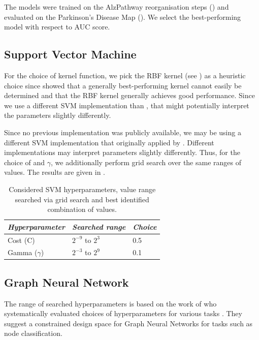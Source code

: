 \documentclass[
	fontsize=10pt, %
	twoside=false, %
	secnumdepth=1, %
  toc=indentunnumbered %
]{kaobook}
\begin{document}
The models were trained on the AlzPathway reorganisation steps (\ADMap)
and evaluated on the Parkinson's Disease Map (\PDMap). We select the
best-performing model with respect to AUC score.

\subsection{Support Vector Machine}

For the choice of kernel function, we pick the RBF kernel (see
) as a heuristic choice since
\citeauthor{nielsen_MachineLearningSupport_2019} showed that a generally
best-performing kernel cannot easily be determined and that the RBF
kernel generally achieves good performance.
%
Since we use a different SVM implementation than \nielsen, that might
potentially interpret the parameters slightly differently.

Since no previous implementation was publicly available, we may be using a
different SVM implementation that originally applied by \nielsen. Different
implementations may interpret parameters slightly differently. Thus, for the
choice of  and $\gamma$, we additionally perform grid search over the same
ranges of values.
%
The results are given in
.

\begin{table}[h]
  \begin{tabular}[h]{| l | l | l |}
    \textit{Hyperparameter} & \textit{Searched range} & \textit{Choice} \\
    \hline
    Cost (C) & $2^{-9}$ to $2^3$ & 0.5 \\
    Gamma ($\gamma$) & $2^{-3}$ to $2^{9}$ & 0.1
  \end{tabular}
  \caption{Considered SVM hyperparameters, value range searched via grid search and
    best identified combination of values.}
  \label{tab:svm-hyperparams}
\end{table}



\subsection{Graph Neural Network}

The range of searched hyperparameters is based on the work of
\citeauthor{you_design_2020} who systematically evaluated choices of hyperparameters for
various tasks \cite{you_design_2020}. They suggest a constrained design space
for Graph Neural Networks for tasks such as node classification.  
\end{document}
